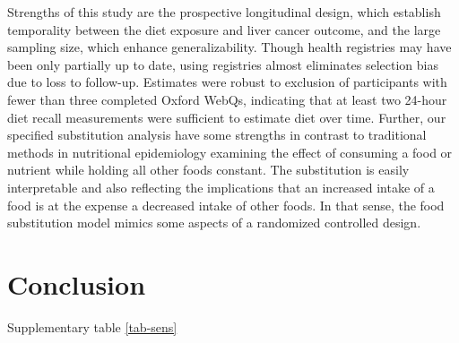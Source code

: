 \documentclass[sn-basic,Numbered,iicol,pdflatex]{sn-jnl}
\begin{document}
Strengths of this study are the prospective longitudinal design, which
establish temporality between the diet exposure and liver cancer
outcome, and the large sampling size, which enhance generalizability.
Though health registries may have been only partially up to date, using
registries almost eliminates selection bias due to loss to follow-up.
Estimates were robust to exclusion of participants with fewer than three
completed Oxford WebQs, indicating that at least two 24-hour diet recall
measurements were sufficient to estimate diet over time. Further, our
specified substitution analysis have some strengths in contrast to
traditional methods in nutritional epidemiology examining the effect of
consuming a food or nutrient while holding all other foods constant. The
substitution is easily interpretable and also reflecting the
implications that an increased intake of a food is at the expense a
decreased intake of other foods. In that sense, the food substitution
model mimics some aspects of a randomized controlled design.

\hypertarget{sec5}{%
\section{Conclusion}\label{sec5}}

Supplementary table \ref{tab-sens}
\end{document}
